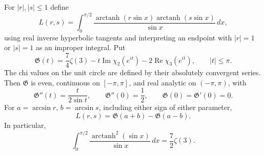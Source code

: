 \begin{theorem}
\label{xid:wat:thm:atanh}
For $|r|,|s|\leq1$ define
\[
 L(r,s)=\int_0^{\pi/2}
    \frac{\operatorname{arctanh}(r\sin x)
          \operatorname{arctanh}(s\sin x)}{\sin x}\,dx,
\]
using real inverse hyperbolic tangents and interpreting an endpoint
with $|r|=1$ or $|s|=1$ as an improper integral. Put
\begin{equation}\label{xid:wat:eq:Gclosed}
 \mathfrak G(t)=\frac74\zeta(3)
     -t\operatorname{Im}\chi_2(e^{it})
     -2\operatorname{Re}\chi_3(e^{it}),\qquad |t|\leq\pi.
\end{equation}
The chi values on the unit circle are defined by their absolutely
convergent series. Then $\mathfrak G$ is even, continuous on
$[-\pi,\pi]$, and real analytic on $(-\pi,\pi)$, with
\begin{equation}\label{xid:wat:eq:Gode}
 \mathfrak G''(t)=\frac{t}{2\sin t},\qquad
 \mathfrak G''(0)=\frac12,\qquad
 \mathfrak G(0)=\mathfrak G'(0)=0.
\end{equation}
For $a=\arcsin r$, $b=\arcsin s$, including either sign of either
parameter,
\begin{equation}\label{xid:wat:eq:atanhmain}
 \boxed{\displaystyle
 L(r,s)=\mathfrak G(a+b)-\mathfrak G(a-b).}
\end{equation}
In particular,
\begin{equation}\label{xid:wat:eq:atanh11}
 \boxed{\displaystyle
 \int_0^{\pi/2}\frac{\operatorname{arctanh}^2(\sin x)}{\sin x}\,dx
       =\frac72\zeta(3).}
\end{equation}
\end{theorem}

